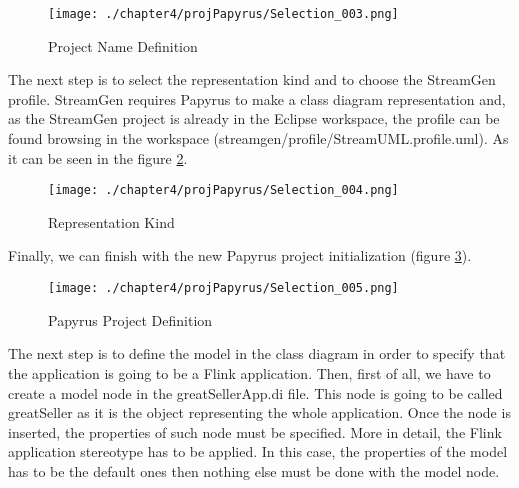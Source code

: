 \begin{figure}
\centering
{\texttt{[image: ./chapter4/projPapyrus/Selection\_003.png]}}
\caption{Project Name Definition}
\label{fig:Project Name Definition}
\end{figure}

The next step is to select the representation kind and to choose the StreamGen profile. StreamGen requires Papyrus to make a class diagram representation and, as the StreamGen project is already in the Eclipse workspace, the profile can be found browsing in the workspace (streamgen/profile/StreamUML.profile.uml). As it can be seen in the figure \ref{fig:Representation Kind}.

\begin{figure}
\centering
{\texttt{[image: ./chapter4/projPapyrus/Selection\_004.png]}}
\caption{Representation Kind}
\label{fig:Representation Kind}
\end{figure}

Finally, we can finish with the new Papyrus project initialization (figure \ref{fig:Papyrus Project Definition}).

\begin{figure}
\centering
{\texttt{[image: ./chapter4/projPapyrus/Selection\_005.png]}}
\caption{Papyrus Project Definition}
\label{fig:Papyrus Project Definition}
\end{figure}

The next step is to define the model in the class diagram in order to specify that the application is going to be a Flink application. Then, first of all, we have to create a model node in the greatSellerApp.di file. This node is going to be called greatSeller as it is the object representing the whole application. Once the node is inserted, the properties of such node must be specified. More in detail, the Flink application stereotype has to be applied. In this case, the properties of the model has to be the default ones then nothing else must be done with the model node.

